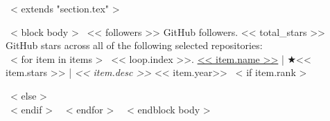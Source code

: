 ~< extends "section.tex" >~

~< block body >~
<< followers >> GitHub followers.
<< total_stars >> GitHub stars across all of the following selected repositories: \\

  ~< for item in items >~
    << loop.index >>.
    \href{<< item.repo_url >>}{<< item.name >>} | $\bigstar$<< item.stars >> |
    \emph{<< item.desc >>}
    \hfill << item.year>>
    ~< if item.rank >~
    \\ {\scriptsize \color{gray}{Rank \#<< item.rank >> among all contributors with << item.commits >> commits, << item.additons >> lines of additions and << item.deletions >> lines of deletions} \par}
    ~< else >~
      \\[0.5mm]
    ~< endif >~
  ~< endfor >~
~< endblock body >~
